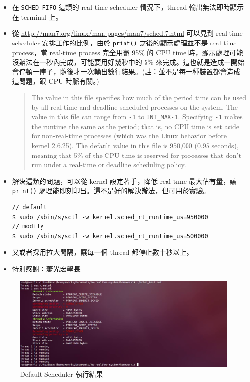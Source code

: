 \documentclass{res}
\begin{document}
\begin{resume}
\begin{itemize}
	\item 在 \lstinline{SCHED_FIFO} 這類的 real time scheduler 情況下，thread 輸出無法即時顯示在 terminal 上。
	
	\item 從 \url{http://man7.org/linux/man-pages/man7/sched.7.html} 可以見到 real-time scheduler 安排工作的比例，由於 \lstinline{print()} 之後的顯示處理並不是 real-time process，當 real-time process 完全用盡 95\% 的 CPU time 時，顯示處理可能沒辦法在一秒內完成，可能要用好幾秒中的 5\% 來完成。這也就是造成一開始會停頓一陣子，隨後才一次輸出數行結果。(註：並不是每一種裝置都會造成這問題，跟 CPU 時脈有關。)
	\blockquote{The value in this file specifies how much of the period time  can be used by all real-time and deadline scheduled processes on the system.  The value in this file can range from \lstinline{-1} to \lstinline{INT_MAX-1}.  Specifying \lstinline{-1} makes the runtime the same as the period; that is, no CPU time is set aside for non-real-time processes (which was the Linux behavior before kernel 2.6.25). The default value in this file is 950,000 (0.95 seconds), meaning that 5\% of the CPU time is reserved for processes that don't run under a real-time or deadline scheduling policy.}
	
	\item 解決這類的問題，可以從 kernel 設定著手，降低 real-time 最大佔有量，讓 \lstinline{print()} 處理能即刻印出。這不是好的解決辦法，但可用於實驗。
\begin{lstlisting}
// default
$ sudo /sbin/sysctl -w kernel.sched_rt_runtime_us=950000
// modify
$ sudo /sbin/sysctl -w kernel.sched_rt_runtime_us=500000
\end{lstlisting}

	\item 又或者採用拉大間隔，讓每一個 thread 都停止數十秒以上。
	\item 特別感謝：蕭光宏學長
\end{itemize}

\vspace*{.1in} 

\begin{figure}[htp]
    \begin{center}
        \includegraphics[width=400pt]{images/result1.jpg}
        \caption{Default Scheduler 執行結果}
        \label{fig: result}
    \end{center}
\end{figure}


\end{resume}
\end{document}
